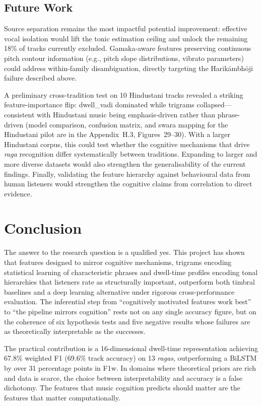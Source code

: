 \documentclass[11pt,a4paper]{article}
\begin{document}
{\subsection{Future Work}

Source separation remains the most impactful potential improvement: effective vocal isolation would lift the tonic estimation ceiling and unlock the remaining 18\% of tracks currently excluded. Gamaka-aware features preserving continuous pitch contour information (e.g., pitch slope distributions, vibrato parameters) could address within-family disambiguation, directly targeting the Harik\=ambh\=oji failure described above.

A preliminary cross-tradition test on 10 Hindustani tracks revealed a striking feature-importance flip: dwell\_vadi dominated while trigrams collapsed---consistent with Hindustani music being emphasis-driven rather than phrase-driven (model comparison, confusion matrix, and swara mapping for the Hindustani pilot are in the Appendix~H.3, Figures~29--30). With a larger Hindustani corpus, this could test whether the cognitive mechanisms that drive \textit{raga} recognition differ systematically between traditions. Expanding to larger and more diverse datasets would also strengthen the generalisability of the current findings. Finally, validating the feature hierarchy against behavioural data from human listeners would strengthen the cognitive claims from correlation to direct evidence.

\section{Conclusion}

The answer to the research question is a qualified yes. This project has shown that features designed to mirror cognitive mechanisms, trigrams encoding statistical learning of characteristic phrases and dwell-time profiles encoding tonal hierarchies that listeners rate as structurally important, outperform both timbral baselines and a deep learning alternative under rigorous cross-performance evaluation. The inferential step from ``cognitively motivated features work best'' to ``the pipeline mirrors cognition'' rests not on any single accuracy figure, but on the coherence of six hypothesis tests and five negative results whose failures are as theoretically interpretable as the successes.

The practical contribution is a 16-dimensional dwell-time representation achieving 67.8\% weighted F1 (69.6\% track accuracy) on 13 \textit{ragas}, outperforming a BiLSTM by over 31 percentage points in F1w. In domains where theoretical priors are rich and data is scarce, the choice between interpretability and accuracy is a false dichotomy. The features that music cognition predicts should matter are the features that matter computationally.

}
\end{document}
